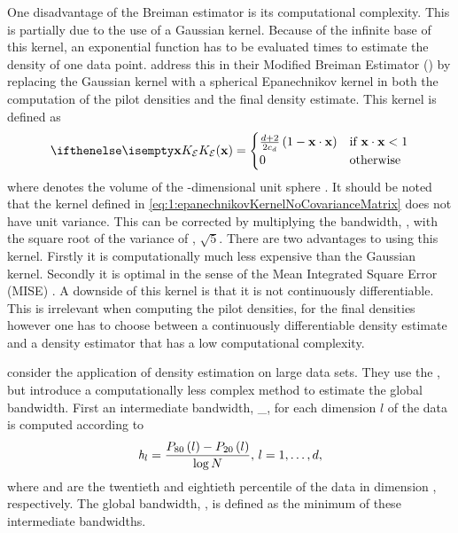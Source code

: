 	One disadvantage of the Breiman estimator is its computational complexity. This is partially due to the use of a Gaussian kernel. Because of the infinite base of this kernel, an exponential function has to be evaluated \varNumPatterns times to estimate the density of one data point. 
	\textcite{wilkinson1995dataplot} address this in their Modified Breiman Estimator (\mbe) by replacing the Gaussian kernel with a spherical Epanechnikov kernel in both the computation of the pilot densities and the final density estimate. This kernel is defined as
	\begin{equation}\label{eq:1:epanechnikovKernelNoCovarianceMatrix}
		\varKernel[\varEpan]{\varPattern} = 
		\begin{cases}
			\frac{\varDim + 2}{2\varUnitSphere{\varDim}} \left( 1 - \varPattern \cdot \varPattern \right) & \text{if } \varPattern \cdot \varPattern < 1\\
			0 & \text{otherwise}
		\end{cases}
	\end{equation}
	 where \varUnitSphere{\varDim} denotes the volume of the \varDim-dimensional unit sphere \cite{epanechnikov1969non}. It should be noted that the kernel defined in \cref{eq:1:epanechnikovKernelNoCovarianceMatrix} does not have unit variance. This can be corrected by multiplying the bandwidth, \varBandwidth, with the square root of the variance of \varKernel[\varEpan]{}, \ie $\sqrt{5}$. There are two advantages to using this kernel. Firstly it is computationally much less expensive than the Gaussian kernel. Secondly it is optimal in the sense of the Mean Integrated Square Error (MISE) \cite{epanechnikov1969non}. A downside of this kernel is that it is not continuously differentiable. This is irrelevant when computing the pilot densities, for the final densities however one has to choose between a continuously differentiable density estimate and a density estimator that has a low computational complexity.

	\textcite{ferdosi2011comparison} consider the application of density estimation on large data sets. They use the \mbe, but introduce a computationally less complex method to estimate the global bandwidth. First an intermediate bandwidth, \varBandwidth_\itDim, for each dimension $l$ of the data is computed according to		
	\begin{equation}\label{eq:1:ferdosiGeneralBandwidth}
			\mathit{h}_{l} = \frac{P_{80}\left( l \right) - P_{20}\left( l \right)}{\log N}, \, l = 1, \dotsc, d,
		\end{equation}
	where  and  are the twentieth and eightieth percentile of the data in dimension \itDim, respectively. The global bandwidth, \varBandwidth, is defined as the minimum of these intermediate bandwidths.

